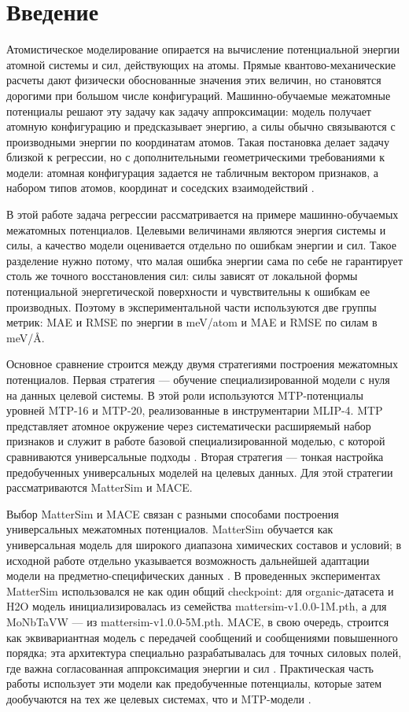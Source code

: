 \section{Введение}

Атомистическое моделирование опирается на вычисление потенциальной энергии атомной системы и сил, действующих на атомы. Прямые квантово-механические расчеты дают физически обоснованные значения этих величин, но становятся дорогими при большом числе конфигураций. Машинно-обучаемые межатомные потенциалы решают эту задачу как задачу аппроксимации: модель получает атомную конфигурацию и предсказывает энергию, а силы обычно связываются с производными энергии по координатам атомов. Такая постановка делает задачу близкой к регрессии, но с дополнительными геометрическими требованиями к модели: атомная конфигурация задается не табличным вектором признаков, а набором типов атомов, координат и соседских взаимодействий \cite{m3gnet2022,mace2022}.

В этой работе задача регрессии рассматривается на примере машинно-обучаемых межатомных потенциалов. Целевыми величинами являются энергия системы и силы, а качество модели оценивается отдельно по ошибкам энергии и сил. Такое разделение нужно потому, что малая ошибка энергии сама по себе не гарантирует столь же точного восстановления сил: силы зависят от локальной формы потенциальной энергетической поверхности и чувствительны к ошибкам ее производных. Поэтому в экспериментальной части используются две группы метрик: MAE и RMSE по энергии в meV/atom и MAE и RMSE по силам в meV/Å.

Основное сравнение строится между двумя стратегиями построения межатомных потенциалов. Первая стратегия — обучение специализированной модели с нуля на данных целевой системы. В этой роли используются MTP-потенциалы уровней MTP-16 и MTP-20, реализованные в инструментарии MLIP-4. MTP представляет атомное окружение через систематически расширяемый набор признаков и служит в работе базовой специализированной моделью, с которой сравниваются универсальные подходы \cite{shapeev2016mtp,mlip4software}. Вторая стратегия — тонкая настройка предобученных универсальных моделей на целевых данных. Для этой стратегии рассматриваются MatterSim и MACE.

Выбор MatterSim и MACE связан с разными способами построения универсальных межатомных потенциалов. MatterSim обучается как универсальная модель для широкого диапазона химических составов и условий; в исходной работе отдельно указывается возможность дальнейшей адаптации модели на предметно-специфических данных \cite{mattersim2024}. В проведенных экспериментах MatterSim использовался не как один общий checkpoint: для organic-датасета и H2O модель инициализировалась из семейства mattersim-v1.0.0-1M.pth, а для MoNbTaVW — из mattersim-v1.0.0-5M.pth. MACE, в свою очередь, строится как эквивариантная модель с передачей сообщений и сообщениями повышенного порядка; эта архитектура специально разрабатывалась для точных силовых полей, где важна согласованная аппроксимация энергии и сил \cite{mace2022}. Практическая часть работы использует эти модели как предобученные потенциалы, которые затем дообучаются на тех же целевых системах, что и MTP-модели \cite{macefinetuningdocs,mattersimfinetuningdocs}.

